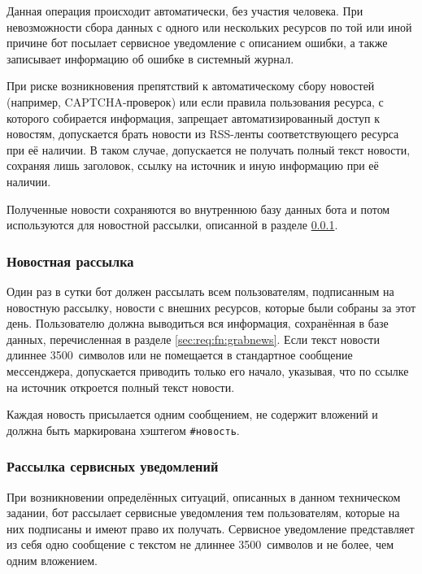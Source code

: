         Данная операция происходит автоматически, без участия человека. При невозможности сбора данных
        с одного или нескольких ресурсов по той или иной причине бот посылает сервисное уведомление
        с описанием ошибки, а также записывает информацию об ошибке в системный журнал.

        При риске возникновения препятствий к автоматическому сбору новостей (например, CAPTCHA-проверок)
        или если правила пользования ресурса, с которого собирается информация, запрещает автоматизированный
        доступ к новостям, допускается брать новости из RSS-ленты соответствующего ресурса при её наличии.
        В таком случае, допускается не получать полный текст новости, сохраняя лишь заголовок,
        ссылку на источник и иную информацию при её наличии.

        Полученные новости сохраняются во внутреннюю базу данных бота и потом используются для новостной
        рассылки, описанной в разделе \ref{sec:req:fn:news}.


    \subsubsection{Новостная рассылка}
        \label{sec:req:fn:news}
        Один раз в сутки бот
        должен рассылать всем пользователям, подписанным на новостную рассылку, новости с внешних
        ресурсов, которые были собраны за этот день. Пользователю
        должна выводиться вся информация, сохранённая в базе данных, перечисленная в разделе
        \ref{sec:req:fn:grabnews}. Если текст новости длиннее 3500~символов или не помещается в
        стандартное сообщение мессенджера, допускается приводить только его начало, указывая,
        что по ссылке на источник откроется полный текст новости.

        Каждая новость присылается одним сообщением, не содержит вложений и
        должна быть маркирована хэштегом \hbox{\texttt{\#новость}}.

    \subsubsection{Рассылка сервисных уведомлений}
        \label{sec:req:fn:service}
        При возникновении определённых ситуаций, описанных в данном техническом задании,
        бот рассылает сервисные уведомления тем пользователям, которые на них подписаны и имеют
        право их получать. Сервисное уведомление представляет из себя одно сообщение с текстом
        не длиннее 3500~символов и не более, чем одним вложением.

